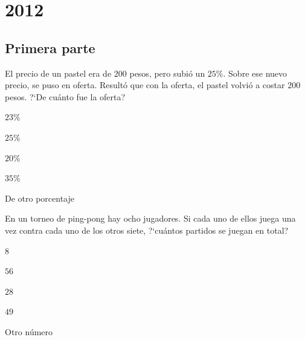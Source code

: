 \chapter{2012}
\label{cha:2012}

\section{Primera parte}
\label{sec:primera-parte2012}

\begin{Problema}{1}
  El precio de un pastel era de $200$ pesos, pero subi\'o un
  $25\%$. Sobre ese nuevo precio, se puso en oferta. Result\'o que con
  la oferta, el pastel volvi\'o a costar $200$ pesos. ?`De cu\'anto
  fue la oferta?

  \begin{inparaenum}
  \item $23\%$ \esp
  \item $25\%$ \esp
  \item $20\%$ \esp
  \item $35\%$ \esp
  \item De otro porcentaje
  \end{inparaenum}
\end{Problema}

\begin{Solucion}
  
\end{Solucion}

\begin{Problema}{2}
  En un torneo de ping-pong hay ocho jugadores. Si cada uno de ellos
  juega una vez contra cada uno de los otros siete, ?`cu\'antos
  partidos se juegan en total?

  \begin{inparaenum}
  \item $8$ \esp
  \item $56$ \esp
  \item $28$ \esp
  \item $49$ \esp 
  \item Otro n\'umero
  \end{inparaenum}
\end{Problema}

\begin{Solucion}
  
\end{Solucion}

